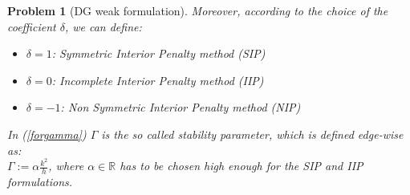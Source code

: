 \documentclass[a4paper,11pt]{article}
\newtheorem{problem}{Problem}
\begin{document}
\begin{problem}[DG weak formulation]
    \noindent Moreover, according to the choice of the coefficient $\delta$, we can define:
    \begin{itemize}
    \item $\delta=1$: Symmetric Interior Penalty method (SIP)
    \item $\delta=0$: Incomplete Interior Penalty method (IIP)
    \item $\delta=-1$: Non Symmetric Interior Penalty method (NIP) 
    \end{itemize}
     \vspace{2mm}
    \noindent In (\ref{forgamma}) $\Gamma$ is the so called stability parameter, which is defined edge-wise as:\\ $\Gamma := \alpha \frac{k^2}{h}$, where $ \alpha \in \mathbb{R}$ has to be chosen high enough for the SIP and IIP formulations.
    \end{problem}
\end{document}
